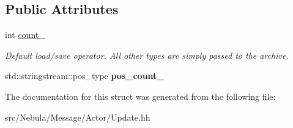 \subsection*{\-Public \-Attributes}
\begin{DoxyCompactItemize}
\item 
\hypertarget{structNeb_1_1Message_1_1Actor_1_1Update_a4e82d6d5a0a84f6593b7322a535fbb6c}{int \hyperlink{structNeb_1_1Message_1_1Actor_1_1Update_a4e82d6d5a0a84f6593b7322a535fbb6c}{count\-\_\-}}\label{structNeb_1_1Message_1_1Actor_1_1Update_a4e82d6d5a0a84f6593b7322a535fbb6c}

\begin{DoxyCompactList}\small\item\em \-Default load/save operator. \-All other types are simply passed to the archive. \end{DoxyCompactList}\item 
\hypertarget{structNeb_1_1Message_1_1Actor_1_1Update_afbf7999816776b210f2641cd3a575212}{std\-::stringstream\-::pos\-\_\-type {\bfseries pos\-\_\-count\-\_\-}}\label{structNeb_1_1Message_1_1Actor_1_1Update_afbf7999816776b210f2641cd3a575212}

\end{DoxyCompactItemize}


\-The documentation for this struct was generated from the following file\-:\begin{DoxyCompactItemize}
\item 
src/\-Nebula/\-Message/\-Actor/\-Update.\-hh\end{DoxyCompactItemize}
